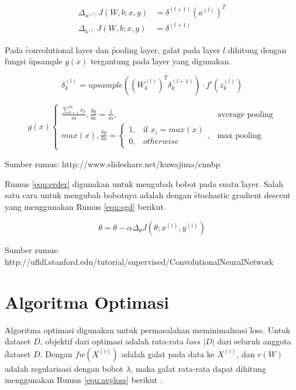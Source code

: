 \begin{equation}
\label{equ:erder}
\begin{aligned}
\Delta_{w^{(l)}}J(W,b;x,y)&=\delta^{(l+1)}(a^{(l)})^{T} \\
\Delta_{b^{(l)}}J(W,b;x,y)&=\delta^{(l+1)}
\end{aligned}
\end{equation}

Pada \f{convolutional layer} dan \f{pooling layer}, galat pada \f{layer} $l$ dihitung dengan fungsi \f{upsample} $g(x)$ tergantung pada \f{layer} yang digunakan.

\begin{equation}
\label{equ:errorc}
\delta^{(l)}_{k} = upsample((W^{(l)}_{k})^{T}\delta^{(l+1)}_{k}) \cdot f'(z^{(l)}_{k}) 
\end{equation}

\[
g(x)
\begin{cases}
\frac{\sum_{k=1}^{m} x_{k}}{m}, \frac{\delta g}{\delta x} = \frac{1}{m}, & \text{average pooling} \\
max(x), \frac{\delta g}{\delta x} =
\begin{cases}
1, & \text{if } x_{i} = max(x) \\
0, & otherwise
\end{cases}
, & \text{max pooling}
\end{cases}
\]

\begin{center}
	{\small Sumber rumus: http://www.slideshare.net/kuwajima/cnnbp}
\end{center}

Rumus \ref{equ:erder} digunakan untuk mengubah bobot pada suatu \f{layer}. Salah satu cara untuk mengubah bobotnya adalah dengan \f{stochastic gradient descent} yang menggunakan Rumus \ref{equ:sgd} berikut.

\begin{equation}
\label{equ:sgd}
\theta = \theta-\alpha\Delta_{\theta}J(\theta;x^{(i)},y^{(i)})
\end{equation}

\begin{center}
	{\small Sumber rumus: http://ufldl.stanford.edu/tutorial/supervised/ConvolutionalNeuralNetwork}
\end{center}


\section{Algoritma Optimasi}
Algoritma optimasi digunakan untuk permasalahan meminimalisasi \f{loss}. Untuk \f{dataset} $D$, objektif dari optimasi adalah rata-rata $loss$ $|D|$ dari seluruh anggota \f{dataset} $D$. Dengan $fw(X^{(i)})$ adalah galat pada data ke $X^{(i)}$, dan $r(W)$ adalah regularisasi dengan bobot $\lambda$, maka galat rata-rata dapat dihitung menggunakan Rumus \ref{equ:avgloss} berikut .

